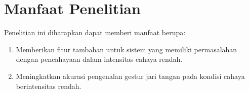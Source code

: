 \section{Manfaat Penelitian}
Penelitian ini diharapkan dapat memberi manfaat berupa:
\begin{enumerate}
\item Memberikan fitur tambahan untuk sistem yang memiliki permasalahan dengan pencahayaan dalam intensitas cahaya rendah.
\item Meningkatkan akurasi pengenalan gestur jari tangan pada kondisi cahaya berintensitas rendah.
\end{enumerate}


